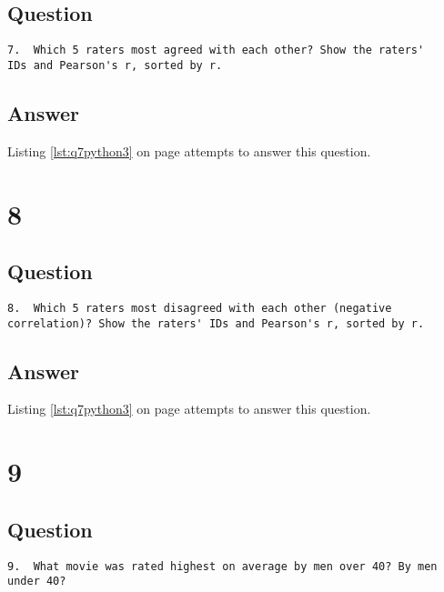 \documentclass[letterpaper,11pt]{article}
\begin{document}
\subsection*{Question}

\begin{verbatim}
7.  Which 5 raters most agreed with each other? Show the raters'
IDs and Pearson's r, sorted by r.
\end{verbatim}

\subsection*{Answer}

Listing \ref{lst:q7python3} on page \pageref{lst:q7python3} attempts to answer this question.

\newpage

\section*{8}

\subsection*{Question}

\begin{verbatim}
8.  Which 5 raters most disagreed with each other (negative
correlation)? Show the raters' IDs and Pearson's r, sorted by r.
\end{verbatim}

\subsection*{Answer}

Listing \ref{lst:q7python3} on page \pageref{lst:q7python3} attempts to answer this question.

\newpage

\section*{9}

\subsection*{Question}

\begin{verbatim}
9.  What movie was rated highest on average by men over 40? By men
under 40?
\end{verbatim}
\end{document}
